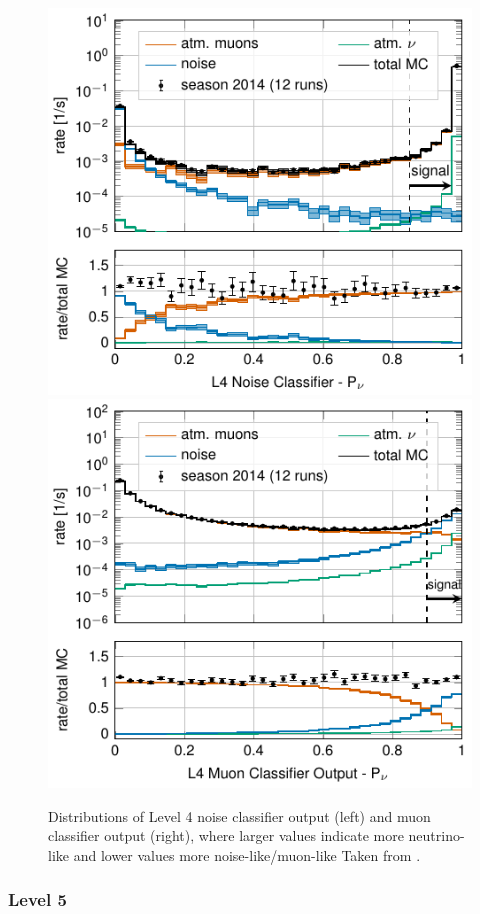 \begin{figure}[h]
\centering 
\includegraphics[width=0.49\linewidth]{figures/simulation_and_processing/selection/l4_noise_classifier_probnu.pdf}
\includegraphics[width=0.49\linewidth]{figures/simulation_and_processing/selection/l4_muon_classifier_probnu.pdf}

\caption[Level 4 classifier outputs (muon and noise)]{Distributions of Level 4 noise classifier output (left) and muon classifier output (right), where larger values indicate more neutrino-like and lower values more noise-like/muon-like Taken from \cite{OVS_PRD}.}
\end{figure}




\subsubsection{Level 5} 

